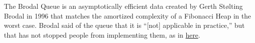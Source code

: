 The Brodal Queue is an asymptotically efficient data created by Gerth Stølting Brodal in 1996 that matches the amortized complexity of a Fibonacci Heap in the worst case.  Brodal said of the queue that it is ``[not] applicable in practice,'' but that has not stopped people from implementing them, as in \href{https://github.com/scalaz/scalaz/blob/master/core/src/main/scala/scalaz/Heap.scala}{here}.
